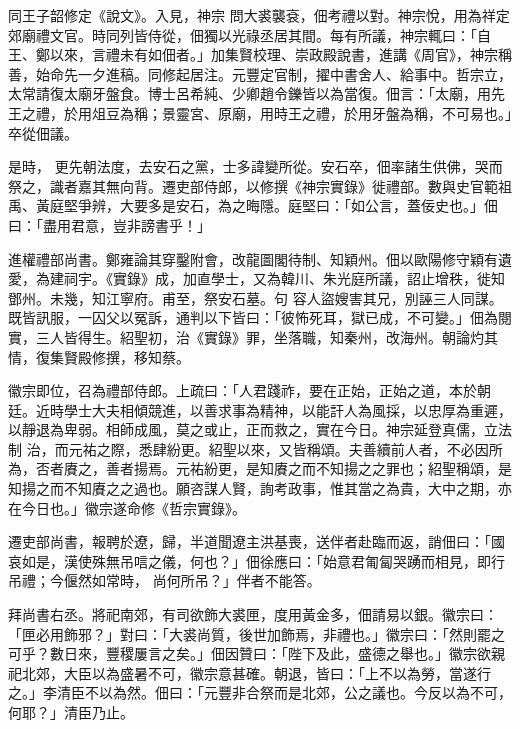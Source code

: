 \begin{pinyinscope}
 同王子韶修定《說文》。入見，神宗
 問大裘襲袞，佃考禮以對。神宗悅，用為祥定郊廟禮文官。時同列皆侍從，佃獨以光祿丞居其間。每有所議，神宗輒曰：「自王、鄭以來，言禮未有如佃者。」加集賢校理、崇政殿說書，進講《周官》，神宗稱善，始命先一夕進稿。同修起居注。元豐定官制，擢中書舍人、給事中。哲宗立，太常請復太廟牙盤食。博士呂希純、少卿趙令鑠皆以為當復。佃言：「太廟，用先王之禮，於用俎豆為稱；景靈宮、原廟，用時王之禮，於用牙盤為稱，不可易也。」卒從佃議。



 是時，
 更先朝法度，去安石之黨，士多諱變所從。安石卒，佃率諸生供佛，哭而祭之，識者嘉其無向背。遷吏部侍郎，以修撰《神宗實錄》徙禮部。數與史官範祖禹、黃庭堅爭辨，大要多是安石，為之晦隱。庭堅曰：「如公言，蓋佞史也。」佃曰：「盡用君意，豈非謗書乎！」



 進權禮部尚書。鄭雍論其穿鑿附會，改龍圖閣待制、知穎州。佃以歐陽修守穎有遺愛，為建祠宇。《實錄》成，加直學士，又為韓川、朱光庭所議，詔止增秩，徙知鄧州。未幾，知江寧府。甫至，祭安石墓。句
 容人盜嫂害其兄，別誣三人同謀。既皆訊服，一囚父以冤訴，通判以下皆曰：「彼怖死耳，獄已成，不可變。」佃為閱實，三人皆得生。紹聖初，治《實錄》罪，坐落職，知秦州，改海州。朝論灼其情，復集賢殿修撰，移知蔡。



 徽宗即位，召為禮部侍郎。上疏曰：「人君踐祚，要在正始，正始之道，本於朝廷。近時學士大夫相傾競進，以善求事為精神，以能訐人為風採，以忠厚為重遲，以靜退為卑弱。相師成風，莫之或止，正而救之，實在今日。神宗延登真儒，立法制
 治，而元祐之際，悉肆紛更。紹聖以來，又皆稱頌。夫善續前人者，不必因所為，否者賡之，善者揚焉。元祐紛更，是知賡之而不知揚之之罪也；紹聖稱頌，是知揚之而不知賡之之過也。願咨謀人賢，詢考政事，惟其當之為貴，大中之期，亦在今日也。」徽宗遂命修《哲宗實錄》。



 遷吏部尚書，報聘於遼，歸，半道聞遼主洪基喪，送伴者赴臨而返，誚佃曰：「國哀如是，漢使殊無吊唁之儀，何也？」佃徐應曰：「始意君匍匐哭踴而相見，即行吊禮；今偃然如常時，
 尚何所吊？」伴者不能答。



 拜尚書右丞。將祀南郊，有司欲飾大裘匣，度用黃金多，佃請易以銀。徽宗曰：「匣必用飾邪？」對曰：「大裘尚質，後世加飾焉，非禮也。」徽宗曰：「然則罷之可乎？數日來，豐稷屢言之矣。」佃因贊曰：「陛下及此，盛德之舉也。」徽宗欲親祀北郊，大臣以為盛暑不可，徽宗意甚確。朝退，皆曰：「上不以為勞，當遂行之。」李清臣不以為然。佃曰：「元豐非合祭而是北郊，公之議也。今反以為不可，何耶？」清臣乃止。




\end{pinyinscope}
